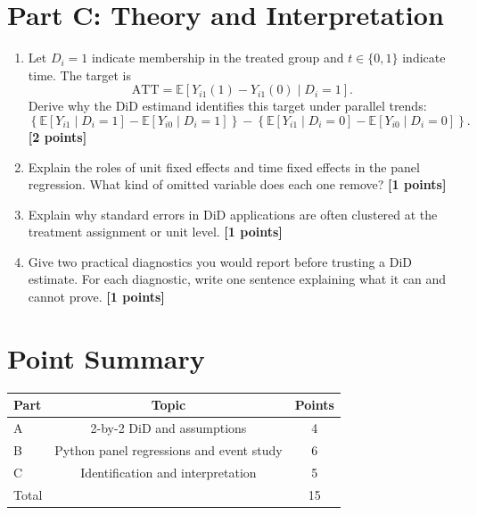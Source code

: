 \documentclass[11pt]{article}
\newcommand{\E}{\mathbb{E}}
\newcommand{\ATT}{\mathrm{ATT}}
\newcommand{\points}[1]{\hfill \textbf{[#1 points]}}
\begin{document}
\section*{Part C: Theory and Interpretation}

\begin{enumerate}[label=C\arabic*.]
  \item Let \(D_i=1\) indicate membership in the treated group and \(t\in\{0,1\}\) indicate time. The target is
  \[
    \ATT=\E[Y_{i1}(1)-Y_{i1}(0)\mid D_i=1].
  \]
  Derive why the DiD estimand identifies this target under parallel trends:
  \[
    \left\{\E[Y_{i1}\mid D_i=1]-\E[Y_{i0}\mid D_i=1]\right\}
    -
    \left\{\E[Y_{i1}\mid D_i=0]-\E[Y_{i0}\mid D_i=0]\right\}.
  \]
  \points{2}

  \item Explain the roles of unit fixed effects and time fixed effects in the panel regression. What kind of omitted variable does each one remove? \points{1}

  \item Explain why standard errors in DiD applications are often clustered at the treatment assignment or unit level. \points{1}

  \item Give two practical diagnostics you would report before trusting a DiD estimate. For each diagnostic, write one sentence explaining what it can and cannot prove. \points{1}
\end{enumerate}

\section*{Point Summary}
\begin{center}
\begin{tabular}{lcc}
\toprule
Part & Topic & Points \\
\midrule
A & 2-by-2 DiD and assumptions & 4 \\
B & Python panel regressions and event study & 6 \\
C & Identification and interpretation & 5 \\
\midrule
Total & & 15 \\
\bottomrule
\end{tabular}
\end{center}
\end{document}
